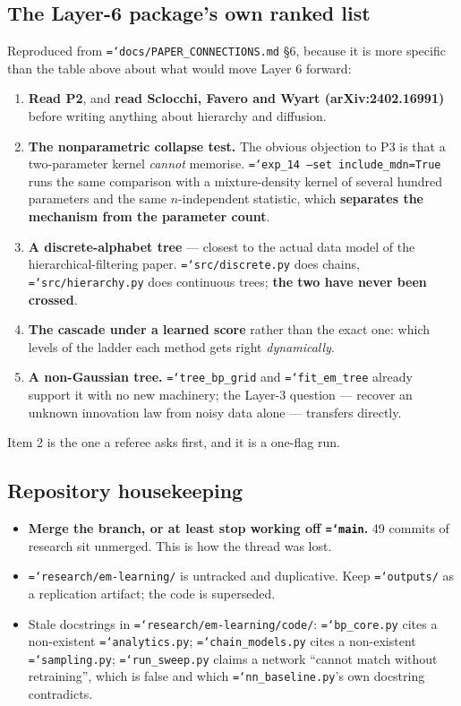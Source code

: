 \documentclass[11pt,a4paper]{article}
\newcommand{\code}[1]{\texttt{\small\hyphenchar\font=`\-\relax #1}}
\begin{document}
\subsection{The Layer-6 package's own ranked list}

Reproduced from \code{docs/PAPER\_CONNECTIONS.md} §6, because it is more specific than the
table above about what would move Layer 6 forward:

\begin{enumerate}
\item \textbf{Read P2}, and \textbf{read Sclocchi, Favero and Wyart (arXiv:2402.16991)}
before writing anything about hierarchy and diffusion.
\item \textbf{The nonparametric collapse test.} The obvious objection to P3 is that a
two-parameter kernel \emph{cannot} memorise. \code{exp\_14 --set include\_mdn=True} runs the
same comparison with a mixture-density kernel of several hundred parameters and the same
$n$-independent statistic, which \textbf{separates the mechanism from the parameter count}.
\item \textbf{A discrete-alphabet tree} --- closest to the actual data model of the
hierarchical-filtering paper. \code{src/discrete.py} does chains, \code{src/hierarchy.py}
does continuous trees; \textbf{the two have never been crossed}.
\item \textbf{The cascade under a learned score} rather than the exact one: which levels of
the ladder each method gets right \emph{dynamically}.
\item \textbf{A non-Gaussian tree.} \code{tree\_bp\_grid} and \code{fit\_em\_tree} already
support it with no new machinery; the Layer-3 question --- recover an unknown innovation law
from noisy data alone --- transfers directly.
\end{enumerate}

\noindent
Item 2 is the one a referee asks first, and it is a one-flag run.

\subsection{Repository housekeeping}

\begin{itemize}
\item \textbf{Merge the branch, or at least stop working off \code{main}.} 49 commits of
research sit unmerged. This is how the thread was lost.
\item \code{research/em-learning/} is untracked and duplicative. Keep \code{outputs/} as a
replication artifact; the code is superseded.
\item Stale docstrings in \code{research/em-learning/code/}: \code{bp\_core.py} cites a
non-existent \code{analytics.py}; \code{chain\_models.py} cites a non-existent
\code{sampling.py}; \code{run\_sweep.py} claims a network ``cannot match without
retraining'', which is false and which \code{nn\_baseline.py}'s own docstring contradicts.
\end{itemize}
\end{document}
